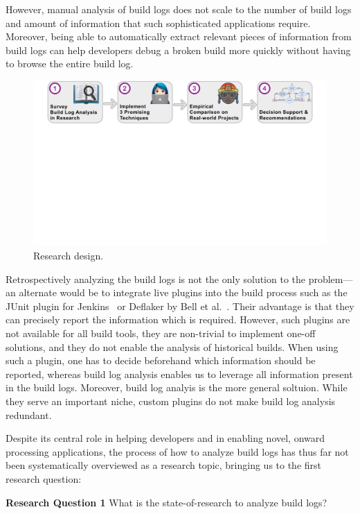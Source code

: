 However, manual analysis of build logs does not
scale to the number of build logs and amount of information that such
sophisticated applications require.
Moreover, being able to
automatically extract relevant pieces of information from build logs
can help
developers debug a broken build more quickly without having to browse
the entire build log.

\begin{figure}[htb]
	\centering
	\includegraphics[width=\textwidth, trim={1.2cm 10.5cm 1.2cm 0cm},
	clip]{img/overview.pdf}
	\caption{Research design.}
	\label{fig:overview}
\end{figure}

Retrospectively analyzing the build logs is not the only solution to the problem---an alternate would be to integrate live plugins into the build process
 such as the JUnit
plugin for Jenkins~\cite{jenkins2020junit-plugin} or
Deflaker by Bell et al.~\cite{bell2018deflaker}. 
Their advantage is that they can precisely report the information which
is required.
However, such plugins are not available for all build tools, they are non-trivial to implement one-off solutions, and they
do not enable the analysis of historical builds. When using such a plugin, one has to decide
beforehand which information should be reported, whereas
build log analysis enables us to leverage all information
present in the build logs. Moreover, build log analyis is the more general soltuion. While they serve an important niche, custom plugins do not make build log analysis redundant.

Despite its central role in helping developers and in enabling
novel, onward processing applications,
the process of how to
analyze build logs has thus far not been systematically
overviewed as a research topic, bringing us to the first
research question:
\begin{simplebox}[minipage boxed title*=-5cm]{\textbf{Research Question
1}}
What is the state-of-research to analyze build logs?
\end{simplebox}

